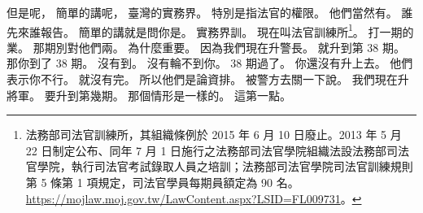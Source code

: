 \hypertarget{c01:cue:4015}{}但是呢，
\hypertarget{c01:cue:4016}{}簡單的講呢，
\hypertarget{c01:cue:4017}{}臺灣的實務界。
\hypertarget{c01:cue:4018}{}特別是指法官的權限。
\hypertarget{c01:cue:4019}{}他們當然有。
\hypertarget{c01:cue:4020}{}誰先來誰報告。
\hypertarget{c01:cue:4021}{}簡單的講就是問你是。
\hypertarget{c01:cue:4022}{}實務界訓。
\hypertarget{c01:cue:4023}{}現在叫法官訓練所\footnote{法務部司法官訓練所，其組織條例於 2015 年 6 月 10 日廢止。2013 年 5 月 22 日制定公布、同年 7 月 1 日施行之法務部司法官學院組織法設法務部司法官學院，執行司法官考試錄取人員之培訓；法務部司法官學院司法官訓練規則第 5 條第 1 項規定，司法官學員每期員額定為 90 名。\url{https://mojlaw.moj.gov.tw/LawContent.aspx?LSID=FL009731}。}。
\hypertarget{c01:cue:4024}{}打一期的業。
\hypertarget{c01:cue:4025}{}那期別對他們兩。
\hypertarget{c01:cue:4026}{}為什麼重要。
\hypertarget{c01:cue:4027}{}因為我們現在升警長。
\hypertarget{c01:cue:4028}{}就升到第 38 期。
\hypertarget{c01:cue:4029}{}那你到了 38 期。
\hypertarget{c01:cue:4030}{}沒有到。
\hypertarget{c01:cue:4031}{}沒有輪不到你。
\hypertarget{c01:cue:4032}{}38 期過了。
\hypertarget{c01:cue:4033}{}你還沒有升上去。
\hypertarget{c01:cue:4034}{}他們表示你不行。
\hypertarget{c01:cue:4035}{}就沒有完。
\hypertarget{c01:cue:4036}{}所以他們是論資排。
\hypertarget{c01:cue:4037}{}被警方去關一下說。
\hypertarget{c01:cue:4038}{}我們現在升將軍。
\hypertarget{c01:cue:4039}{}要升到第幾期。
\hypertarget{c01:cue:4040}{}那個情形是一樣的。
\hypertarget{c01:cue:4041}{}這第一點。

